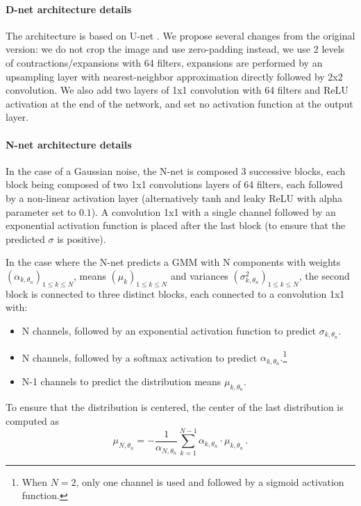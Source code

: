 \documentclass[lettersize,journal]{IEEEtran}
\begin{document}
\paragraph{D-net architecture details}
The architecture is based on U-net \cite{ronneberger2015u}.
We propose several changes from the original version: we do not crop the image and use zero-padding instead, we use 2 levels of contractions/expansions with 64 filters, expansions are performed by an upsampling layer with nearest-neighbor approximation directly followed by 2x2 convolution.
We also add two layers of 1x1 convolution with 64 filters and ReLU activation at the end of the network, and set no activation function at the output layer.

\paragraph{N-net architecture details}
In the case of a Gaussian noise, the N-net is composed 3 successive blocks, each block being composed of two 1x1 convolutions layers of 64 filters, each followed by a non-linear activation layer (alternatively tanh and leaky ReLU with alpha parameter set to $0.1$). A convolution 1x1 with a single channel followed by an exponential activation function is placed after the last block (to ensure that the predicted $\sigma$ is positive).

In the case where the N-net predicts a GMM with N components with weights $(\alpha_{k,\theta_n})_{1\leqslant k\leqslant N}$, means $(\mu_k)_{1\leqslant k\leqslant N}$ and variances $(\sigma^2_{k,\theta_n})_{1\leqslant k\leqslant N}$, the second block is connected to three distinct blocks, each connected to a convolution 1x1 with:
\begin{itemize}
  \item N channels, followed by an exponential activation function to predict $\sigma_{k,\theta_n}$.
  \item N channels, followed by a softmax activation to predict $\alpha_{k,\theta_n}.$\footnote{When $N=2$, only one channel is used and followed by a sigmoid activation function.}
  \item N-1 channels to predict the distribution means $\mu_{k,\theta_n}$.
\end{itemize}
To ensure that the distribution is centered, the center of the last distribution is computed as
$$
\mu_{N,\theta_n} = - \frac{1}{\alpha_{N,\theta_n}} \sum_{k=1}^{N-1}\alpha_{k,\theta_n}\cdot\mu_{k,\theta_n}\,.
$$
\end{document}

